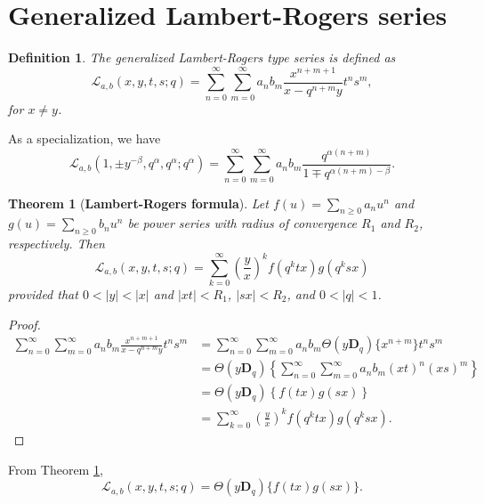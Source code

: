 \documentclass[12pt]{article}
\newcommand{\D}{\mathbf{D}}
\newcommand{\thp}{\Theta}
\newtheorem{theorem}{Theorem}
\newtheorem{definition}{Definition}
\begin{document}
\section{Generalized Lambert-Rogers series}

\begin{definition}
The generalized Lambert-Rogers type series is defined as
\begin{equation}
    \mathcal{L}_{a,b}(x,y,t,s;q)=\sum_{n=0}^{\infty}\sum_{m=0}^{\infty}a_{n}b_{m}\frac{x^{n+m+1}}{x-q^{n+m}y}t^ns^m,
\end{equation}
for $x\neq y$.
\end{definition}
As a specialization, we have
\begin{equation}
    \mathcal{L}_{a,b}(1,\pm y^{-\beta},q^\alpha,q^\alpha;q^\alpha)=\sum_{n=0}^{\infty}\sum_{m=0}^{\infty}a_{n}b_{m}\frac{q^{\alpha(n+m)}}{1\mp q^{\alpha(n+m)-\beta}}.
\end{equation}

\begin{theorem}[{\bf Lambert-Rogers formula}]\label{rogers}
Let $f(u)=\sum_{n\ge0}a_nu^n$ and $g(u)=\sum_{n\ge0}b_nu^n$ be power series with radius of convergence $R_1$ and $R_2$, respectively. Then
    \begin{equation}
        \mathcal{L}_{a,b}(x,y,t,s;q)=\sum_{k=0}^{\infty}\left(\frac{y}{x}\right)^{k}f(q^ktx)g(q^ksx)
    \end{equation}
provided that $0<\vert y\vert<\vert x\vert$ and $\vert xt\vert<R_{1}$, $\vert sx\vert<R_{2}$, and $0<\vert q\vert<1$.    
\end{theorem}
\begin{proof}
    \begin{align*}
        \sum_{n=0}^{\infty}\sum_{m=0}^{\infty}a_{n}b_{m}\frac{x^{n+m+1}}{x-q^{n+m}y}t^ns^m
        &=\sum_{n=0}^{\infty}\sum_{m=0}^{\infty}a_{n}b_{m}\thp(y\D_{q})\{x^{n+m}\}t^ns^m\\
        &=\thp(y\D_{q})\left\{\sum_{n=0}^{\infty}\sum_{m=0}^{\infty}a_{n}b_{m}(xt)^n(xs)^m\right\}\\
        &=\thp(y\D_{q})\left\{f(tx)g(sx)\right\}\\
        &=\sum_{k=0}^{\infty}\left(\frac{y}{x}\right)^{k}f(q^ktx)g(q^ksx).
    \end{align*}
\end{proof}
From Theorem \ref{rogers},
\begin{equation}
    \mathcal{L}_{a,b}(x,y,t,s;q)=\thp(y\D_q)\{f(tx)g(sx)\}.
\end{equation}
\end{document}

